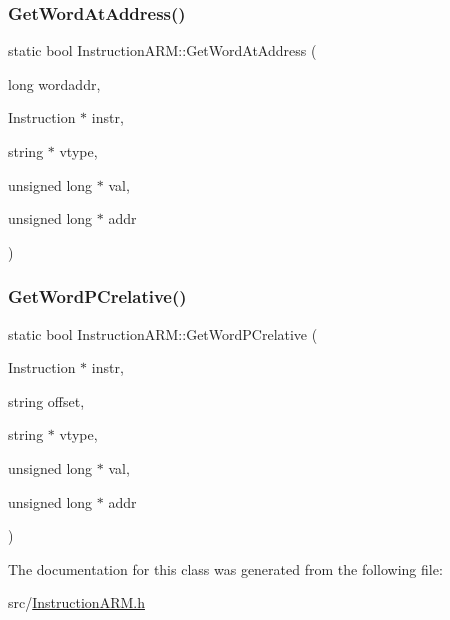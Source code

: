 \mbox{\label{classInstructionARM_ae9c5e0e9a1eebec1a25d5c444f99565c}} 
\subsubsection{\texorpdfstring{Get\+Word\+At\+Address()}{GetWordAtAddress()}}
{\footnotesize\ttfamily static bool Instruction\+A\+R\+M\+::\+Get\+Word\+At\+Address (\begin{DoxyParamCaption}\item[{long}]{wordaddr,  }\item[{Instruction $\ast$}]{instr,  }\item[{string $\ast$}]{vtype,  }\item[{unsigned long $\ast$}]{val,  }\item[{unsigned long $\ast$}]{addr }\end{DoxyParamCaption})\hspace{0.3cm}{\ttfamily [static]}}

\mbox{\label{classInstructionARM_a9a2b36b492279f08bf57170e91a49e03}} 
\subsubsection{\texorpdfstring{Get\+Word\+P\+Crelative()}{GetWordPCrelative()}}
{\footnotesize\ttfamily static bool Instruction\+A\+R\+M\+::\+Get\+Word\+P\+Crelative (\begin{DoxyParamCaption}\item[{Instruction $\ast$}]{instr,  }\item[{string}]{offset,  }\item[{string $\ast$}]{vtype,  }\item[{unsigned long $\ast$}]{val,  }\item[{unsigned long $\ast$}]{addr }\end{DoxyParamCaption})\hspace{0.3cm}{\ttfamily [static]}}



The documentation for this class was generated from the following file\+:\begin{DoxyCompactItemize}
\item 
src/\hyperlink{InstructionARM_8h}{Instruction\+A\+R\+M.\+h}\end{DoxyCompactItemize}
